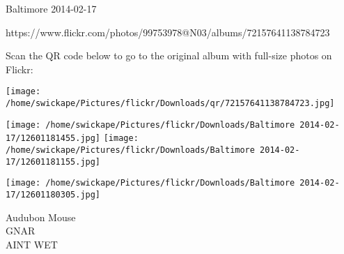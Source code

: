 \documentclass[10pt,letterpaper]{article}
\begin{document}
Baltimore 2014-02-17

https://www.flickr.com/photos/99753978@N03/albums/72157641138784723

Scan the QR code below to go to the original album with full-size photos on Flickr:

\texttt{[image: /home/swickape/Pictures/flickr/Downloads/qr/72157641138784723.jpg]}
\pagebreak

\texttt{[image: /home/swickape/Pictures/flickr/Downloads/Baltimore 2014-02-17/12601181455.jpg]}
\texttt{[image: /home/swickape/Pictures/flickr/Downloads/Baltimore 2014-02-17/12601181155.jpg]}

\texttt{[image: /home/swickape/Pictures/flickr/Downloads/Baltimore 2014-02-17/12601180305.jpg]}

Audubon Mouse\\
GNAR\\
AINT WET
\pagebreak
\end{document}
